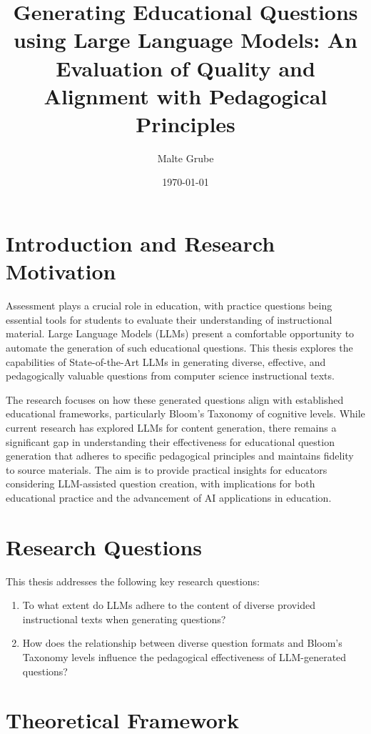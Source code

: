 \documentclass[12pt]{article}
\title{Generating Educational Questions using Large Language Models: An Evaluation of Quality and Alignment with Pedagogical Principles}
\author{Malte Grube}
\date{\today}
\begin{document}
\maketitle

\section{Introduction and Research Motivation}
Assessment plays a crucial role in education, with practice questions being essential tools for students to evaluate their understanding of instructional material. Large Language Models (LLMs) present a comfortable opportunity to automate the generation of such educational questions. This thesis explores the capabilities of State-of-the-Art LLMs in generating diverse, effective, and pedagogically valuable questions from computer science instructional texts.

The research focuses on how these generated questions align with established educational frameworks, particularly Bloom's Taxonomy of cognitive levels. While current research has explored LLMs for content generation, there remains a significant gap in understanding their effectiveness for educational question generation that adheres to specific pedagogical principles and maintains fidelity to source materials. The aim is to provide practical insights for educators considering LLM-assisted question creation, with implications for both educational practice and the advancement of AI applications in education.

\section{Research Questions}
This thesis addresses the following key research questions:
\begin{enumerate}
    \item To what extent do LLMs adhere to the content of diverse provided instructional texts when generating questions?

    \item How does the relationship between diverse question formats and Bloom's Taxonomy levels influence the pedagogical effectiveness of LLM-generated questions?
\end{enumerate}

\pagebreak

\section{Theoretical Framework}
\end{document}

